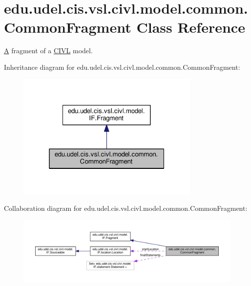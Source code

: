 \hypertarget{classedu_1_1udel_1_1cis_1_1vsl_1_1civl_1_1model_1_1common_1_1CommonFragment}{}\section{edu.\+udel.\+cis.\+vsl.\+civl.\+model.\+common.\+Common\+Fragment Class Reference}
\label{classedu_1_1udel_1_1cis_1_1vsl_1_1civl_1_1model_1_1common_1_1CommonFragment}


\hyperlink{structA}{A} fragment of a \hyperlink{classedu_1_1udel_1_1cis_1_1vsl_1_1civl_1_1CIVL}{C\+I\+V\+L} model.  




Inheritance diagram for edu.\+udel.\+cis.\+vsl.\+civl.\+model.\+common.\+Common\+Fragment\+:
\nopagebreak
\begin{figure}[H]
\begin{center}
\leavevmode
\includegraphics[width=256pt]{classedu_1_1udel_1_1cis_1_1vsl_1_1civl_1_1model_1_1common_1_1CommonFragment__inherit__graph}
\end{center}
\end{figure}


Collaboration diagram for edu.\+udel.\+cis.\+vsl.\+civl.\+model.\+common.\+Common\+Fragment\+:
\nopagebreak
\begin{figure}[H]
\begin{center}
\leavevmode
\includegraphics[width=350pt]{classedu_1_1udel_1_1cis_1_1vsl_1_1civl_1_1model_1_1common_1_1CommonFragment__coll__graph}
\end{center}
\end{figure}
